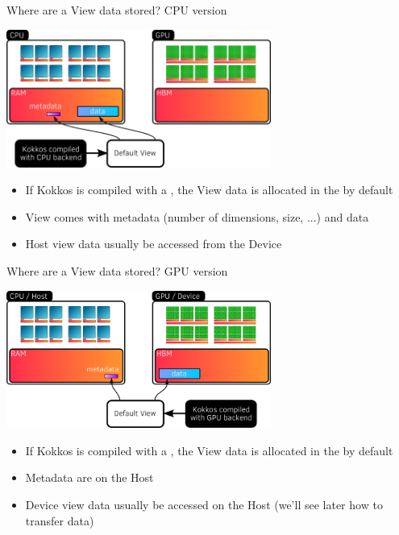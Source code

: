 \documentclass[
    aspectratio=169,
    handout,
]{beamer}
\begin{document}

\begin{frame}{Where are a View data stored? CPU version}
    \begin{center}
        \includegraphics[width=0.65\textwidth]{host_view_memory.png}
    \end{center}
    \begin{itemize}
        \item If Kokkos is compiled with a , the View data is allocated in the  by default
        \item View comes with metadata (number of dimensions, size, ...) and data
        \item Host view data usually  be accessed from the Device
    \end{itemize}
\end{frame}


\begin{frame}{Where are a View data stored? GPU version}
    \begin{center}
        \includegraphics[width=0.65\textwidth]{device_view_memory.png}
    \end{center}
    \begin{itemize}
        \item If Kokkos is compiled with a , the View data is allocated in the  by default
        \item Metadata are on the Host
        \item Device view data usually  be accessed on the Host (we'll see later how to transfer data)
    \end{itemize}
\end{frame}
\end{document}
